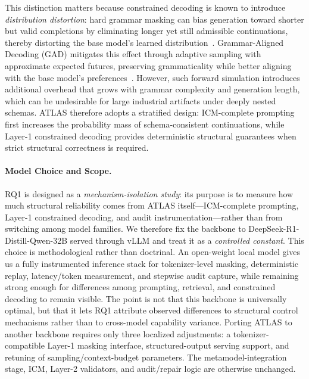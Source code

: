 \documentclass[acmlarge,nonacm]{acmart}
\theoremstyle{acmplain}
\theoremstyle{acmdefinition}
\begin{document}
This distinction matters because constrained decoding is known to introduce \emph{distribution distortion}: hard grammar masking can bias generation toward shorter but valid completions by eliminating longer yet still admissible continuations, thereby distorting the base model's learned distribution~\cite{parkGrammaralignedDecoding2025}. Grammar-Aligned Decoding (GAD) mitigates this effect through adaptive sampling with approximate expected futures, preserving grammaticality while better aligning with the base model's preferences~\cite{parkGrammaralignedDecoding2025}. However, such forward simulation introduces additional overhead that grows with grammar complexity and generation length, which can be undesirable for large industrial artifacts under deeply nested schemas. ATLAS therefore adopts a stratified design: ICM-complete prompting first increases the probability mass of schema-consistent continuations, while Layer-1 constrained decoding provides deterministic structural guarantees when strict structural correctness is required.

\paragraph{Model Choice and Scope.} RQ1 is designed as a \emph{mechanism-isolation study}: its purpose is to measure how much structural reliability comes from ATLAS itself---ICM-complete prompting, Layer-1 constrained decoding, and audit instrumentation---rather than from switching among model families. We therefore fix the backbone to DeepSeek-R1-Distill-Qwen-32B served through vLLM and treat it as a \emph{controlled constant}. This choice is methodological rather than doctrinal. An open-weight local model gives us a fully instrumented inference stack for tokenizer-level masking, deterministic replay, latency/token measurement, and stepwise audit capture, while remaining strong enough for differences among prompting, retrieval, and constrained decoding to remain visible. The point is not that this backbone is universally optimal, but that it lets RQ1 attribute observed differences to structural control mechanisms rather than to cross-model capability variance. Porting ATLAS to another backbone requires only three localized adjustments: a tokenizer-compatible Layer-1 masking interface, structured-output serving support, and retuning of sampling/context-budget parameters. The metamodel-integration stage, ICM, Layer-2 validators, and audit/repair logic are otherwise unchanged.
\end{document}
